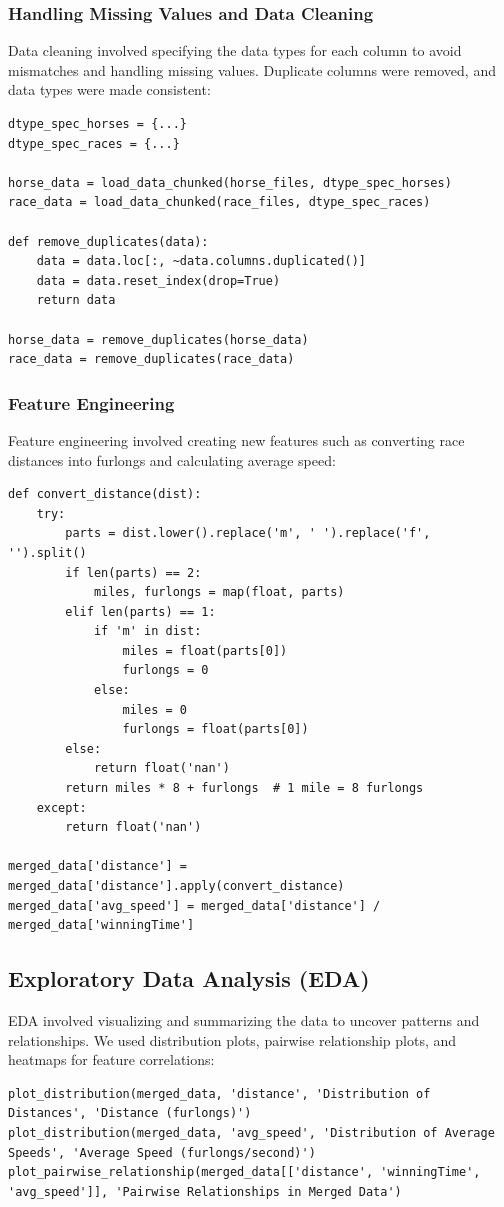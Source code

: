\documentclass{article}
\begin{document}
\subsubsection*{Handling Missing Values and Data Cleaning}
Data cleaning involved specifying the data types for each column to avoid mismatches and handling missing values. Duplicate columns were removed, and data types were made consistent:
\begin{verbatim}
dtype_spec_horses = {...}
dtype_spec_races = {...}

horse_data = load_data_chunked(horse_files, dtype_spec_horses)
race_data = load_data_chunked(race_files, dtype_spec_races)

def remove_duplicates(data):
    data = data.loc[:, ~data.columns.duplicated()]
    data = data.reset_index(drop=True)
    return data

horse_data = remove_duplicates(horse_data)
race_data = remove_duplicates(race_data)
\end{verbatim}

\subsubsection*{Feature Engineering}
Feature engineering involved creating new features such as converting race distances into furlongs and calculating average speed:
\begin{verbatim}
def convert_distance(dist):
    try:
        parts = dist.lower().replace('m', ' ').replace('f', '').split()
        if len(parts) == 2:
            miles, furlongs = map(float, parts)
        elif len(parts) == 1:
            if 'm' in dist:
                miles = float(parts[0])
                furlongs = 0
            else:
                miles = 0
                furlongs = float(parts[0])
        else:
            return float('nan')
        return miles * 8 + furlongs  # 1 mile = 8 furlongs
    except:
        return float('nan')

merged_data['distance'] = merged_data['distance'].apply(convert_distance)
merged_data['avg_speed'] = merged_data['distance'] / merged_data['winningTime']
\end{verbatim}

\subsection*{Exploratory Data Analysis (EDA)}
EDA involved visualizing and summarizing the data to uncover patterns and relationships. We used distribution plots, pairwise relationship plots, and heatmaps for feature correlations:
\begin{verbatim}
plot_distribution(merged_data, 'distance', 'Distribution of Distances', 'Distance (furlongs)')
plot_distribution(merged_data, 'avg_speed', 'Distribution of Average Speeds', 'Average Speed (furlongs/second)')
plot_pairwise_relationship(merged_data[['distance', 'winningTime', 'avg_speed']], 'Pairwise Relationships in Merged Data')
\end{verbatim}
\end{document}
